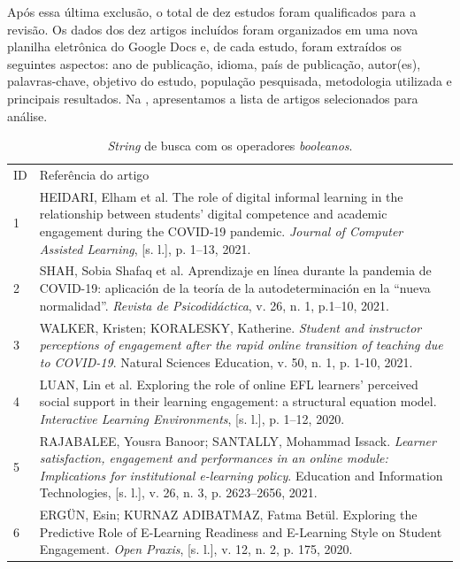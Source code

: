 \documentclass[portuguese]{textolivre}
\begin{document}
Após essa última exclusão, o total de dez estudos foram qualificados para a revisão. Os dados dos dez artigos incluídos foram organizados em uma nova planilha eletrônica do Google Docs e, de cada estudo, foram extraídos os seguintes aspectos: ano de publicação, idioma, país de publicação, autor(es), palavras-chave, objetivo do estudo, população pesquisada, metodologia utilizada e principais resultados. Na , apresentamos a lista de artigos selecionados para análise.

\begin{longtable}{p{}p{}}
\caption{\emph{String} de busca com os operadores \emph{booleanos}.}
\label{tab2}
\small
\\
\toprule 
ID & Referência do artigo
\\
\midrule
1 & HEIDARI, Elham et al. The role of digital informal learning in the relationship between students’ digital competence and academic engagement during the COVID‐19 pandemic. \textit{Journal of Computer Assisted Learning}, [s. l.], p. 1–13, 2021.
\\
2 & SHAH, Sobia Shafaq et al. Aprendizaje en línea durante la pandemia de COVID-19: aplicación de la teoría de la autodeterminación en la “nueva normalidad”. \textit{Revista de Psicodidáctica}, v. 26, n. 1, p.1–10,  2021.
\\
3 & WALKER, Kristen; KORALESKY, Katherine. \textit{Student and instructor perceptions of engagement after the rapid online transition of teaching due to COVID-19}. Natural Sciences Education, v. 50, n. 1, p. 1-10, 2021.
\\
4 & LUAN, Lin et al. Exploring the role of online EFL learners’ perceived social support in their learning engagement: a structural equation model. \textit{Interactive Learning Environments}, [s. l.], p. 1–12, 2020.
\\
5 & RAJABALEE, Yousra Banoor; SANTALLY, Mohammad Issack. \textit{Learner satisfaction, engagement and performances in an online module: Implications for institutional e-learning policy}. Education and Information Technologies, [s. l.], v. 26, n. 3, p. 2623–2656, 2021.
\\
6 & ERGÜN, Esin; KURNAZ ADIBATMAZ, Fatma Betül. Exploring the Predictive Role of E-Learning Readiness and E-Learning Style on Student Engagement. \textit{Open Praxis}, [s. l.], v. 12, n. 2, p. 175, 2020.
\\

\end{longtable}
\end{document}
